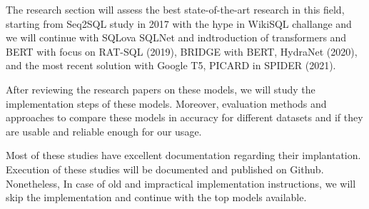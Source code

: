 The research section will assess the best state-of-the-art research in this field, starting from Seq2SQL\cite{zhong_seq2sql_2017} study in 2017 with the hype in WikiSQL challange and we will continue with SQLova\cite{hwang_comprehensive_2019} SQLNet\cite{xu_sqlnet_2017} and indtroduction of transformers and BERT with focus on RAT-SQL\cite{wang_rat-sql_2021} (2019), BRIDGE\cite{lin_bridging_2020} with BERT, HydraNet\cite{lyu_hybrid_2020} (2020), and the most recent solution with Google T5\cite{raffel_exploring_2020}, PICARD\cite{scholak_picard_2021} in SPIDER (2021).


After reviewing the research papers on these models, we will study the implementation steps of these models. Moreover, evaluation methods and approaches to compare these models in accuracy for different datasets and if they are usable and reliable enough for our usage.

Most of these studies have excellent documentation regarding their implantation. Execution of these studies will be documented and published on Github. Nonetheless, In case of old and impractical implementation instructions, we will skip the implementation and continue with the top models available.











